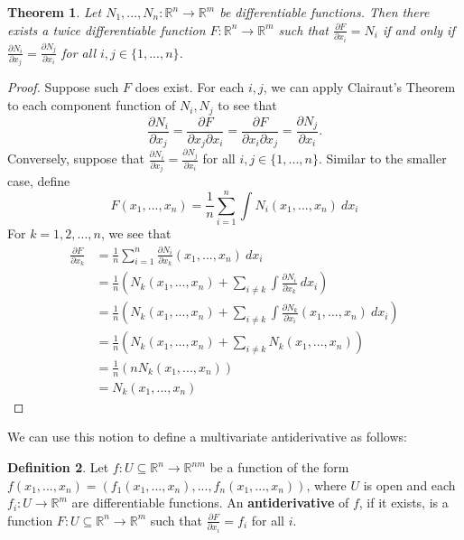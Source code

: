 \documentclass{article}
\theoremstyle{plain} %
\newtheorem{thm}{Theorem}
\numberwithin{thm}{section} %
\theoremstyle{definition}
\newtheorem{defn}[thm]{Definition}
\begin{document}
    \begin{thm}
        Let \(N_1, ..., N_n: \mathbb{R}^n \to \mathbb{R}^m\) be differentiable functions. Then there exists a twice differentiable function \(F: \mathbb{R}^n \to \mathbb{R}^m\) such that \(\frac{\partial F}{\partial x_i} = N_i\) if and only if \(\frac{\partial N_i}{\partial x_j} = \frac{\partial N_j}{\partial x_i}\) for all \(i,j \in \{ 1, ..., n \}\).
    \end{thm}
    \begin{proof}
        Suppose such \(F\) does exist. For each \(i,j\), we can apply Clairaut's Theorem to each component function of \(N_i, N_j\) to see that
        \[
            \frac{\partial N_i}{\partial x_j} = \frac{\partial F}{\partial x_j \partial x_i} = \frac{\partial F}{\partial x_i \partial x_j} = \frac{\partial N_j}{\partial x_i}.
        \]
        Conversely, suppose that \(\frac{\partial N_i}{\partial x_j} = \frac{\partial N_j}{\partial x_i}\) for all \(i,j \in \{ 1, ..., n \}\). Similar to the smaller case, define
        \[
            F(x_1, ..., x_n) = \frac{1}{n}\sum_{i=1}^{n} \int N_i (x_1, ..., x_n)\ dx_i
        \]
        For \(k = 1,2,...,n\), we see that
        \begin{align*}
            \frac{\partial F}{\partial x_k} &= \frac{1}{n}\sum_{i=1}^{n} \frac{\partial N_i}{\partial x_k}(x_1, ..., x_n) \ dx_i \\
            &= \frac{1}{n}\left(N_k(x_1, ..., x_n) + \sum_{i\neq k} \int \frac{\partial N_i}{\partial x_k} \ dx_i \right) \\
            &=  \frac{1}{n} \left( N_k(x_1, ..., x_n) + \sum_{i\neq k} \int \frac{\partial N_k}{\partial x_i} (x_1, ..., x_n)\ dx_i \right) \\
            &= \frac{1}{n} \left( N_k(x_1, ..., x_n) + \sum_{i\neq k} N_k(x_1, ..., x_n) \right) \\
            &= \frac{1}{n}\left( n N_k(x_1, ..., x_n) \right) \\
            &= N_k(x_1, ..., x_n)
        \end{align*}
    \end{proof}
    We can use this notion to define a multivariate antiderivative as follows:
    \begin{defn}
        Let \(f: U \subseteq \mathbb{R}^n \to \mathbb{R}^{nm}\) be a function of the form \(f(x_1, ..., x_n) = (f_1(x_1, ..., x_n), ..., f_n(x_1, ..., x_n))\), where \(U\) is open and each \(f_i: U \to \mathbb{R}^m\) are differentiable functions. An \textbf{antiderivative} of \(f\), if it exists, is a function \(F: U \subseteq \mathbb{R}^n \to \mathbb{R}^m\) such that \(\frac{\partial F}{\partial x_i} = f_i\) for all \(i\).
    \end{defn}
\end{document}
